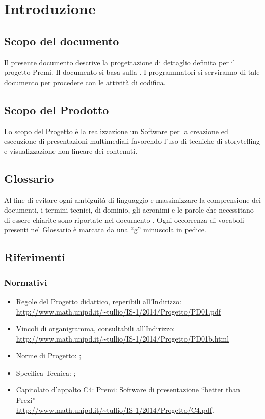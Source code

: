 \section{Introduzione}
\subsection{Scopo del documento}
Il presente documento descrive la progettazione di dettaglio definita per il progetto Premi. Il documento si basa sulla \href{run:../../Esterni/\fSpecificaTencica}{\fEscapeSpecificaTencica}. I programmatori si serviranno di tale documento per procedere con le attività di codifica.
\subsection{Scopo del Prodotto}
Lo scopo del Progetto è la realizzazione un Software per la creazione ed esecuzione di presentazioni multimediali favorendo l’uso di tecniche di storytelling e visualizzazione non lineare dei contenuti.
\subsection{Glossario}
Al fine di evitare ogni ambiguità di linguaggio e massimizzare la comprensione dei documenti, i termini tecnici, di dominio, gli acronimi e le parole che necessitano di essere chiarite sono riportate nel documento \href{run:../../Esterni/\fGlossario}{\fEscapeGlossario}. Ogni occorrenza di vocaboli presenti nel Glossario è marcata da una “g” minuscola in pedice.
\subsection{Riferimenti}
\subsubsection{Normativi}

\begin{itemize}
\item Regole del Progetto didattico, reperibili all'Indirizzo:\\ \url{http://www.math.unipd.it/~tullio/IS-1/2014/Progetto/PD01.pdf}
\item Vincoli di organigramma, consultabili all’Indirizzo:\\ \url{http://www.math.unipd.it/~tullio/IS-1/2014/Progetto/PD01b.html}
\item Norme di Progetto: \href{run:../../Interni/\fNormeDiProgetto}{\fEscapeNormeDiProgetto};
\item Specifica Tecnica: \href{run:../../Esterni/\fSpecificaTencica}{\fEscapeSpecificaTencica};
\item Capitolato d’appalto C4: Premi: Software di presentazione “better than Prezi” \\
\url{http://www.math.unipd.it/~tullio/IS-1/2014/Progetto/C4.pdf}.
\end{itemize}


